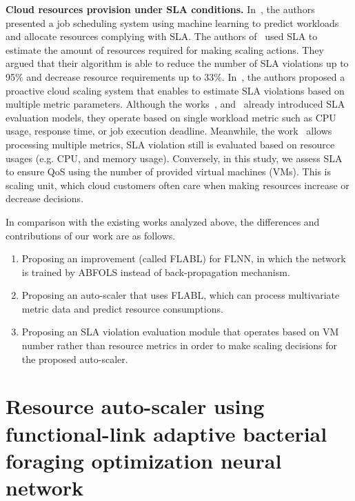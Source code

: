 \documentclass[runningheads]{llncs}
\begin{document}
\textbf{Cloud resources provision under SLA conditions.} In~\cite{ref_reig}, the authors presented a job scheduling system using machine learning to predict workloads and allocate resources complying with SLA. The authors of~\cite{ref_souza} used SLA to estimate the amount of resources required for making scaling actions. They argued that their algorithm is able to reduce the number of SLA violations up to 95$\%$ and decrease resource requirements up to 33$\%$. In~\cite{ref_dang}, the authors proposed a proactive cloud scaling system that enables to estimate SLA violations based on multiple metric parameters. Although the works~\cite{ref_reig}, and~\cite{ref_souza} already introduced SLA evaluation models, they operate based on single workload metric such as CPU usage, response time, or job execution deadline. Meanwhile, the work~\cite{ref_dang} allows processing multiple metrics, SLA violation still is evaluated based on resource usages (e.g. CPU, and memory usage). Conversely, in this study, we assess SLA to ensure QoS using the number of provided virtual machines (VMs). This is scaling unit, which cloud customers often care when making resources increase or decrease decisions. 

In comparison with the existing works analyzed above, the differences and contributions of our work are as follows. 
\begin{enumerate}
	\item Proposing an improvement (called FLABL) for FLNN, in which the network is trained by ABFOLS instead of back-propagation mechanism.
	\item Proposing an auto-scaler that uses  FLABL, %
	which can process multivariate metric data and predict resource consumptions. 
	\item Proposing an SLA violation evaluation module that operates based on VM number rather than resource metrics in order to make scaling decisions for the proposed auto-scaler.
\end{enumerate}





\section{Resource auto-scaler using functional-link adaptive bacterial foraging optimization neural network}
\label{fl_bfonn}
\end{document}
